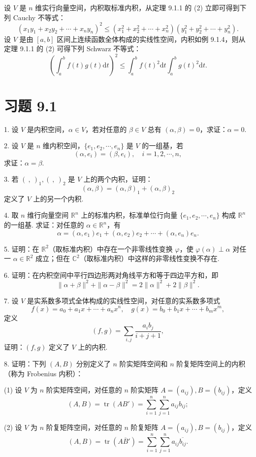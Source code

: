\documentclass[UTF8, 12pt, fontset=fandol, oneside]{ctexart}
\begin{document}
设 $V$ 是 $n$ 维实行向量空间，内积取标准内积，从定理 9.1.1 的 (2) 立即可得到下列 Cauchy 不等式：
\[
  (x_1y_1+x_2y_2+\cdots+x_ny_n)^2
  \le
  (x_1^2+x_2^2+\cdots+x_n^2)(y_1^2+y_2^2+\cdots+y_n^2).
\]
设 $V$ 是由 $[a,b]$ 区间上连续函数全体构成的实线性空间，内积如例 9.1.4，则从定理 9.1.1 的 (2) 可得下列 Schwarz 不等式：
\[
  \left(\int_a^b f(t)g(t)\mathrm dt\right)^2
  \le
  \int_a^b f(t)^2\mathrm dt\int_a^b g(t)^2\mathrm dt.
\]

\section*{习题 9.1}

1. 设 $V$ 是内积空间，$\alpha\in V$，若对任意的 $\beta\in V$ 总有 $(\alpha,\beta)=0$，求证：$\alpha=0$.

2. 设 $V$ 是 $n$ 维内积空间，$\{e_1,e_2,\cdots,e_n\}$ 是 $V$ 的一组基，若
\[
  (\alpha,e_i)=(\beta,e_i),\quad i=1,2,\cdots,n,
\]
求证：$\alpha=\beta$.

3. 若 $(\ ,\ )_1,(\ ,\ )_2$ 是 $V$ 上的两个内积，证明：
\[
  (\alpha,\beta)=(\alpha,\beta)_1+(\alpha,\beta)_2
\]
定义了 $V$ 上的另一个内积.

4. 取 $n$ 维行向量空间 $\mathbb R^n$ 上的标准内积，标准单位行向量 $\{e_1,e_2,\cdots,e_n\}$ 构成 $\mathbb R^n$ 的一组基. 求证：对任意的 $\alpha\in\mathbb R^n$，有
\[
  \alpha=(\alpha,e_1)e_1+(\alpha,e_2)e_2+\cdots+(\alpha,e_n)e_n.
\]

5. 证明：在 $\mathbb R^2$（取标准内积）中存在一个非零线性变换 $\varphi$，使 $\varphi(\alpha)\perp\alpha$ 对任一 $\alpha\in\mathbb R^2$ 成立；但在 $\mathbb C^2$（取标准内积）中这样的非零线性变换不存在.

6. 证明：在内积空间中平行四边形两对角线平方和等于四边平方和，即
\[
  \|\alpha+\beta\|^2+\|\alpha-\beta\|^2=2\|\alpha\|^2+2\|\beta\|^2.
\]

7. 设 $V$ 是实系数多项式全体构成的实线性空间，对任意的实系数多项式
\[
  f(x)=a_0+a_1x+\cdots+a_nx^n,\quad
  g(x)=b_0+b_1x+\cdots+b_mx^m,
\]
定义
\[
  (f,g)=\sum_{i,j}\frac{a_ib_j}{i+j+1},
\]
证明：$(f,g)$ 定义了 $V$ 上的内积.

8. 证明：下列 $(A,B)$ 分别定义了 $n$ 阶实矩阵空间和 $n$ 阶复矩阵空间上的内积（称为 Frobenius 内积）：

(1) 设 $V$ 为 $n$ 阶实矩阵空间，对任意的 $n$ 阶实矩阵 $A=(a_{ij}),B=(b_{ij})$，定义
\[
  (A,B)=\operatorname{tr}(AB')=\sum_{i=1}^n\sum_{j=1}^n a_{ij}b_{ij};
\]

(2) 设 $V$ 为 $n$ 阶复矩阵空间，对任意的 $n$ 阶复矩阵 $A=(a_{ij}),B=(b_{ij})$，定义
\[
  (A,B)=\operatorname{tr}(A\overline B')=\sum_{i=1}^n\sum_{j=1}^n a_{ij}\overline{b_{ij}}.
\]
\end{document}
